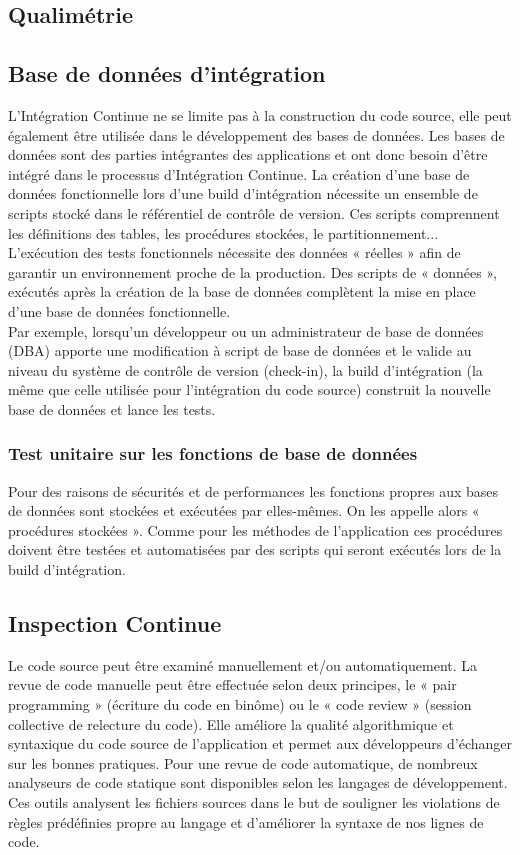     \subsection{Qualimétrie}

    \subsection{Base de données d’intégration}
    L’Intégration Continue ne se limite pas à la construction du code source, elle peut également être utilisée dans le développement des bases de données. Les bases de données sont des parties intégrantes des applications et ont donc besoin d’être intégré dans le processus d’Intégration Continue. La création d’une base de données fonctionnelle lors d’une build d’intégration nécessite un ensemble de scripts stocké dans le référentiel de contrôle de version. Ces scripts comprennent les définitions des tables, les procédures stockées, le partitionnement... L’exécution des tests fonctionnels nécessite des données « réelles » afin de garantir un environnement proche de la production. Des scripts de « données », exécutés après la création de la base de données complètent la mise en place d’une base de données fonctionnelle.\\

    Par exemple, lorsqu’un développeur ou un administrateur de base de données (DBA) apporte une modification à script de base de données et le valide au niveau du système de contrôle de version (check-in), la build d’intégration (la même que celle utilisée pour l’intégration du code source) construit la nouvelle base de données et lance les tests.

    \subsubsection{Test unitaire sur les fonctions de base de données}
    Pour des raisons de sécurités et de performances les fonctions propres aux bases de données sont stockées et exécutées par elles-mêmes. On les appelle alors « procédures stockées ». Comme pour les méthodes de l’application ces procédures doivent être testées et automatisées par des scripts qui seront exécutés lors de la build d’intégration.

    \subsection{Inspection Continue}
    Le code source peut être examiné manuellement et/ou automatiquement. La revue de code manuelle peut être effectuée selon deux principes, le « pair programming » (écriture du code en binôme) ou le « code review » (session collective de relecture du code). Elle améliore la qualité algorithmique et syntaxique du code source de l’application et permet aux développeurs d’échanger sur les bonnes pratiques. Pour une revue de code automatique, de nombreux analyseurs de code statique sont disponibles selon les langages de développement. Ces outils analysent les fichiers sources dans le but de souligner les violations de règles prédéfinies propre au langage et d’améliorer la syntaxe de nos lignes de code.\\

